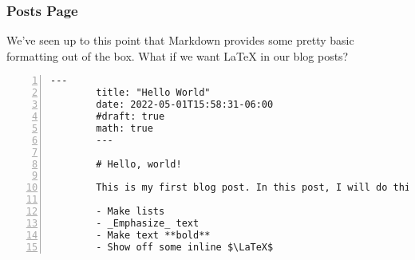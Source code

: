 \begin{frame}[fragile]
    \frametitle{Posts Page}

    We've seen up to this point that Markdown provides some pretty basic formatting out of the box.
    What if we want \LaTeX \: in our blog posts?

    \vfill

    \begin{lstlisting}[style=saneCode,gobble=8,title={content/posts/hello-world.md},numbers=left]
        ---
        title: "Hello World"
        date: 2022-05-01T15:58:31-06:00
        #draft: true
        math: true
        ---

        # Hello, world!

        This is my first blog post. In this post, I will do things like:

        - Make lists
        - _Emphasize_ text
        - Make text **bold**
        - Show off some inline $\LaTeX$
    \end{lstlisting}
\end{frame}